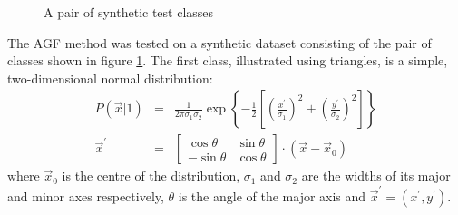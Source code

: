 \begin{figure}
  \caption{A pair of synthetic test classes}
  \label{cls_exmpl}
\end{figure}

The AGF method was tested on a synthetic dataset consisting of the pair of
classes shown in figure \ref{cls_exmpl}.  The first class, illustrated using
triangles, is a simple, two-dimensional normal distribution:
\begin{eqnarray} 
P(\vec x | 1) & = & \frac{1}{2 \pi \sigma_1 \sigma_2} 
	\exp \left \lbrace - \frac{1}{2}\left 
	[\left (\frac{x^\prime}{\sigma_1}\right )^2 + 
	\left (\frac{y^\prime}{\sigma_2} \right )^2 \right ] \right \rbrace
\label{pdf_sc1a} \\
\vec x^\prime & = & \left [\begin{array}{cc} 
	\cos \theta & \sin \theta \\
	-\sin \theta & \cos \theta
\end{array} \right ] \cdot (\vec x - \vec x_0) 
\label{pdf_sc1b} 
\end{eqnarray}
where $\vec x_0$ is the centre of the distribution, $\sigma_1$ and $\sigma_2$ are
the widths of its major and minor axes respectively, $\theta$ is the 
angle of the major axis and $\vec x^\prime = (x^\prime, y^\prime)$.

